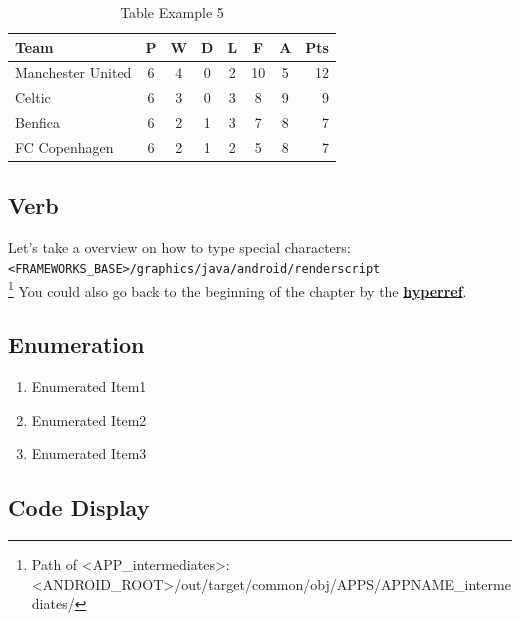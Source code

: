  \begin{table}[htpb]\begin{center}
\caption{Table Example 5}
 \begin{tabular}{l*{6}{c}r}
Team              & P & W & D & L & F  & A & Pts \\
\hline
Manchester United & 6 & 4 & 0 & 2 & 10 & 5 & 12  \\
Celtic            & 6 & 3 & 0 & 3 &  8 & 9 &  9  \\
Benfica           & 6 & 2 & 1 & 3 &  7 & 8 &  7  \\
FC Copenhagen     & 6 & 2 & 1 & 2 &  5 & 8 &  7  \\
\end{tabular}
 \end{center}\end{table}

\subsection{Verb}
\label{ss:VerbUsage}
Let's take a overview on how to type special characters:\\
\verb|<FRAMEWORKS_BASE>/graphics/java/android/renderscript|\\\footnote{Path of <APP\_intermediates>: <ANDROID\_ROOT>/out/target/common/obj/APPS/APPNAME\_intermediates/}
You could also go back to the beginning of the chapter by the \hyperref[c:GetStarted]{\textbf{hyperref}}.

\subsection{Enumeration}
\label{ss:Enumeration}
\begin{enumerate}
\item Enumerated Item1
\item Enumerated Item2
\item Enumerated Item3
\end{enumerate}

\subsection{Code Display}
\label{ss:CodeDisplay}

